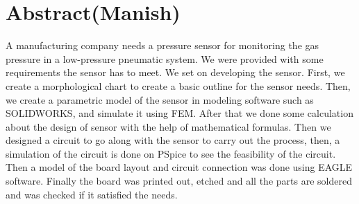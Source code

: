 \chapter{Abstract(Manish)}
\label{sec:abstract}

A manufacturing company needs a pressure sensor for monitoring the gas pressure in a low-pressure pneumatic system. We were provided with some requirements the sensor has to meet. We set on developing the sensor. First, we create a morphological chart to create a basic outline for the sensor needs. Then, we create a parametric model of the sensor in modeling software such as SOLIDWORKS, and simulate it using FEM. After that we done some calculation about the design of sensor with the help of mathematical formulas. Then we designed a circuit to go along with the sensor to carry out the process, then, a simulation of the circuit is done on PSpice to see the feasibility of the circuit. Then a model of the board layout and circuit connection was done using EAGLE software. Finally the board was printed out, etched and all the parts are soldered and was checked if it satisfied the needs.